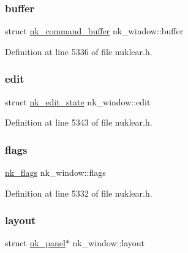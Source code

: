 \subsubsection{\texorpdfstring{buffer}{buffer}}
{\footnotesize\ttfamily struct \mbox{\hyperlink{structnk__command__buffer}{nk\+\_\+command\+\_\+buffer}} nk\+\_\+window\+::buffer}



Definition at line 5336 of file nuklear.\+h.

\mbox{\label{structnk__window_a5ff816faab95d10bf9bdff4518c268ea}} 
\subsubsection{\texorpdfstring{edit}{edit}}
{\footnotesize\ttfamily struct \mbox{\hyperlink{structnk__edit__state}{nk\+\_\+edit\+\_\+state}} nk\+\_\+window\+::edit}



Definition at line 5343 of file nuklear.\+h.

\mbox{\label{structnk__window_ab2c821a48b401380bc00031d5e7b9e87}} 
\subsubsection{\texorpdfstring{flags}{flags}}
{\footnotesize\ttfamily \mbox{\hyperlink{nuklear_8h_a19e0e2f6db4862891d9801de3c3da323}{nk\+\_\+flags}} nk\+\_\+window\+::flags}



Definition at line 5332 of file nuklear.\+h.

\mbox{\label{structnk__window_ad85f14784c55f21daa8e6bd9d226be43}} 
\subsubsection{\texorpdfstring{layout}{layout}}
{\footnotesize\ttfamily struct \mbox{\hyperlink{structnk__panel}{nk\+\_\+panel}}$\ast$ nk\+\_\+window\+::layout}




